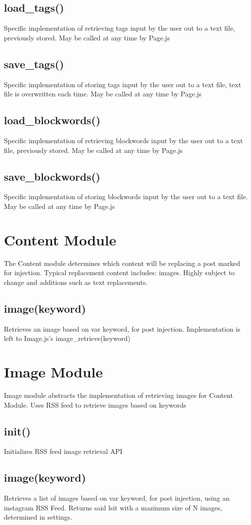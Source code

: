 \documentclass[12pt, titlepage]{article}
\begin{document}
\subsection{load\_tags()}
Specific implementation of retrieving tags input by the user out to a text file, previously stored. May be called at any time by Page.js
\subsection{save\_tags()}
Specific implementation of storing tags input by the user out to a text file, text file is overwritten each time. May be called at any time by Page.js
\subsection{load\_blockwords()}
Specific implementation of retrieving blockwords input by the user out to a text file, previously stored. May be called at any time by Page.js
\subsection{save\_blockwords()}
Specific implementation of storing blockwords input by the user out to a text file. May be called at any time by Page.js

\section{Content Module}
The Content module determines which content will be replacing a post marked for injection. Typical replacement content includes: images. Highly subject to change and additions such as text replacements.
\subsection{image(keyword)}
Retrieves an image based on var keyword, for post injection. Implementation is left to Image.js's image\_retrieve(keyword)

\section{Image Module}
Image module abstracts the implementation of retrieving images for Content Module. Uses RSS feed to retrieve images based on keywords
\subsection{init()}
Initializes RSS feed image retrieval API
\subsection{image(keyword)}
Retrieves a list of images based on var keyword, for post injection, using an instagram RSS Feed. Returns said lsit with a mazimum size of N images, determined in settings.
\end{document}
